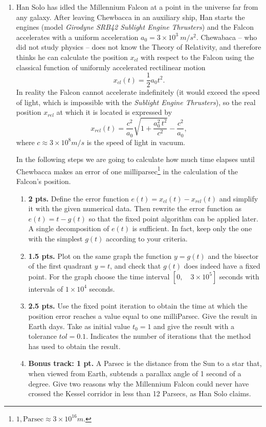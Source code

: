 \begin{paracol}{2}
\begin{enumerate}
\item  Han Solo has idled the Millennium Falcon at a point in the universe far from any galaxy. After leaving Chewbacca in an auxiliary ship, Han starts the engines (model \emph{Girodyne SRB42 Sublight Engine Thrusters}) and the Falcon accelerates with a uniform acceleration $a_0 = 3\times10^3\ m/s^2$. Chewabaca -- who did not study physics -- does not know the Theory of Relativity, and therefore thinks he can calculate the position $x_{cl}$ with respect to the Falcon using the classical function of uniformly accelerated rectilinear motion
\begin{equation}
	x_{cl}(t) =\frac{1}{2}a_0t^2.
\end{equation}
		In reality the Falcon cannot accelerate indefinitely (it would exceed the speed of light, which is impossible with the \emph{Sublight Engine Thrusters}), so the real position $x_{rel}$ at which it is located is expressed by
\begin{equation}
	x_{rel}(t) = \frac{c^2}{a_0}\sqrt{1 + \frac{a_0^2\,t^2}{c^2}} -\frac{c^2}{a_0}, 
\end{equation}
		where $c \approx 3\times 10^8 m/s$  is the speed of light in vacuum. 

		In the following steps we are going to calculate how much time elapses until Chewbacca makes an error of one milliparsec\footnote{$1,\text{Parsec} \approx 3\times 10^{16}m$.} in the calculation of the Falcon's position.

\begin{enumerate}
	\item {\bf 2 pts.} Define the error function $e(t) = x_{cl}(t) - x_{rel}(t)$ and simplify it with the given numerical data. Then rewrite the error function as $e(t) = t - g(t)$ so that the fixed point algorithm can be applied later. A single decomposition of $e(t)$ is sufficient. In fact, keep only the one with the simplest $g(t)$ according to your criteria.
	\item {\bf 1.5 pts.} Plot on the same graph the function $y = g(t)$ and the bisector of the first quadrant $y = t$, and check that $g(t)$ does indeed have a fixed point. For the graph choose the time interval $[0, \quad 3 \times 10^5]$ seconds with intervals of $1\times 10^4$ seconds.
	\item {\bf 2.5 pts.} Use the fixed point iteration to obtain the time at which the position error reaches a value equal to one milliParsec. Give the result in Earth days. Take as initial value $t_0 = 1$ and give the result with a tolerance $tol = 0.1$. Indicates the number of iterations that the method has used to obtain the result.
	\item {\bf Bonus track: 1 pt.} A Parsec is the distance from the Sun to a star that, when viewed from Earth, subtends a parallax angle of 1 second of a degree. Give two reasons why the Millennium Falcon could never have crossed the Kessel corridor in less than 12 Parsecs, as Han Solo claims.

\end{enumerate}
\end{enumerate}


\end{paracol}
